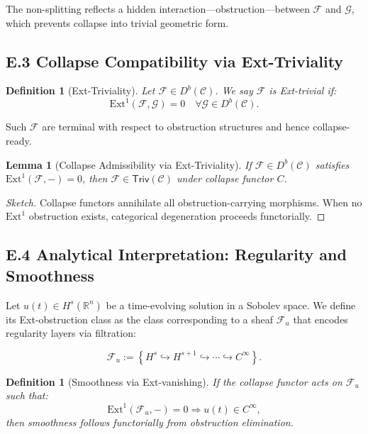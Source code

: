 \documentclass[11pt]{article}
\newtheorem{definition}[theorem]{Definition}
\newtheorem{lemma}[theorem]{Lemma}
\begin{document}
The non-splitting reflects a hidden interaction—obstruction—between \( \mathcal{F} \) and \( \mathcal{G} \),  
which prevents collapse into trivial geometric form.

\subsection*{E.3 Collapse Compatibility via Ext-Triviality}

\begin{definition}[Ext-Triviality]
Let \( \mathcal{F} \in D^b(\mathcal{C}) \). We say \( \mathcal{F} \) is \emph{Ext-trivial} if:
\[
\mathrm{Ext}^1(\mathcal{F}, \mathcal{G}) = 0 \quad \forall \mathcal{G} \in D^b(\mathcal{C}).
\]
\end{definition}

Such \( \mathcal{F} \) are terminal with respect to obstruction structures and hence collapse-ready.

\begin{lemma}[Collapse Admissibility via Ext-Triviality]
If \( \mathcal{F} \in D^b(\mathcal{C}) \) satisfies \( \mathrm{Ext}^1(\mathcal{F}, -) = 0 \),  
then \( \mathcal{F} \in \mathsf{Triv}(\mathcal{C}) \) under collapse functor \( C \).
\end{lemma}

\begin{proof}[Sketch]
Collapse functors annihilate all obstruction-carrying morphisms.  
When no \( \mathrm{Ext}^1 \) obstruction exists, categorical degeneration proceeds functorially.
\end{proof}

\subsection*{E.4 Analytical Interpretation: Regularity and Smoothness}

Let \( u(t) \in H^s(\mathbb{R}^n) \) be a time-evolving solution in a Sobolev space.  
We define its Ext-obstruction class as the class corresponding to a sheaf \( \mathcal{F}_u \)  
that encodes regularity layers via filtration:

\[
\mathcal{F}_u := \left\{ H^s \hookrightarrow H^{s+1} \hookrightarrow \cdots \hookrightarrow C^\infty \right\}.
\]

\begin{definition}[Smoothness via Ext-vanishing]
If the collapse functor acts on \( \mathcal{F}_u \) such that:
\[
\mathrm{Ext}^1(\mathcal{F}_u, -) = 0 \Rightarrow u(t) \in C^\infty,
\]
then smoothness follows functorially from obstruction elimination.
\end{definition}
\end{document}
